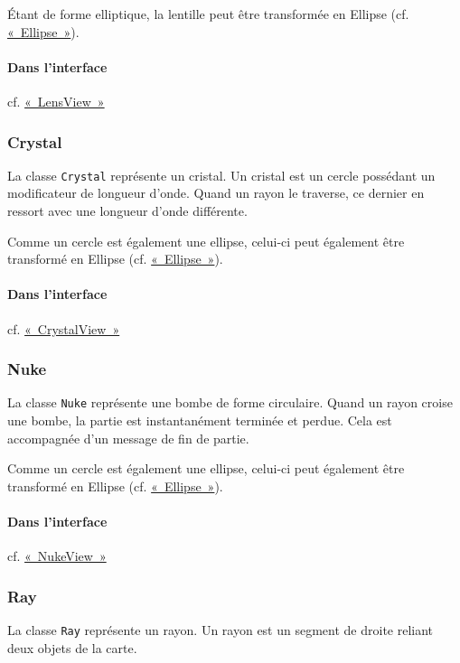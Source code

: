 \documentclass[]{report}
\begin{document}
Étant de forme elliptique, la lentille peut être transformée en Ellipse (cf. \hyperref[Ellipse]{«~Ellipse~»}).

\paragraph{Dans l'interface} cf. \hyperref[LensView]{«~LensView~»}

\newpage
\subsubsection{\label{Crystal}Crystal}

La classe \texttt{Crystal} représente un cristal. Un cristal est un cercle
possédant un modificateur de longueur d'onde. Quand un rayon le traverse, ce dernier
en ressort avec une longueur d'onde différente. 

Comme un cercle est également une ellipse, celui-ci peut également être transformé en Ellipse (cf. \hyperref[Ellipse]{«~Ellipse~»}).

\paragraph{Dans l'interface} cf. \hyperref[CrystalView]{«~CrystalView~»}

\subsubsection{\label{Nuke}Nuke}

La classe \texttt{Nuke} représente une bombe de forme circulaire.
Quand un rayon croise une bombe, la partie est instantanément terminée et perdue. Cela est accompagnée
d'un message de fin de partie.

Comme un cercle est également une ellipse, celui-ci peut également être transformé en Ellipse (cf. \hyperref[Ellipse]{«~Ellipse~»}).

\paragraph{Dans l'interface} cf. \hyperref[NukeView]{«~NukeView~»}

\subsubsection{\label{Ray}Ray}

La classe \texttt{Ray} représente un rayon. Un rayon est un segment de droite reliant
deux objets de la carte. 
\end{document}
